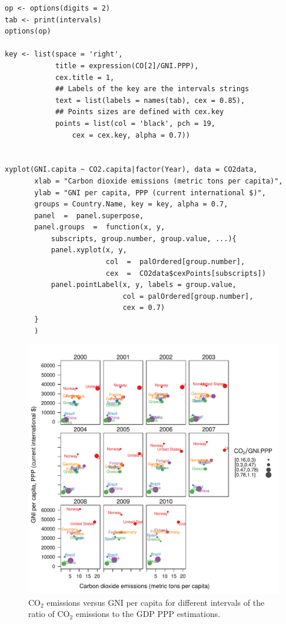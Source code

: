\lstset{language=r,label= ,caption= ,captionpos=b,numbers=none}
\begin{lstlisting}
op <- options(digits = 2)
tab <- print(intervals)
options(op)
  
key <- list(space = 'right',
            title = expression(CO[2]/GNI.PPP),
            cex.title = 1,
            ## Labels of the key are the intervals strings
            text = list(labels = names(tab), cex = 0.85),
            ## Points sizes are defined with cex.key
            points = list(col = 'black', pch = 19,
                cex = cex.key, alpha = 0.7))

  
xyplot(GNI.capita ~ CO2.capita|factor(Year), data = CO2data,
       xlab = "Carbon dioxide emissions (metric tons per capita)",
       ylab = "GNI per capita, PPP (current international $)",
       groups = Country.Name, key = key, alpha = 0.7,
       panel  =  panel.superpose,
       panel.groups  =  function(x, y,
           subscripts, group.number, group.value, ...){
           panel.xyplot(x, y,
                        col  =  palOrdered[group.number],
                        cex  =  CO2data$cexPoints[subscripts])
           panel.pointLabel(x, y, labels = group.value,
                            col = palOrdered[group.number],
                            cex = 0.7)
       }
       ) 
\end{lstlisting}

\begin{figure}[htbp]
\centering
\includegraphics[width=.9\linewidth]{figs/CO2points.pdf}
\caption{\(\mathrm{CO_2}\) emissions versus GNI per capita for different intervals of the ratio of \(\mathrm{CO_2}\) emissions to the GDP PPP estimations. \label{fig:CO2points}}
\end{figure}


